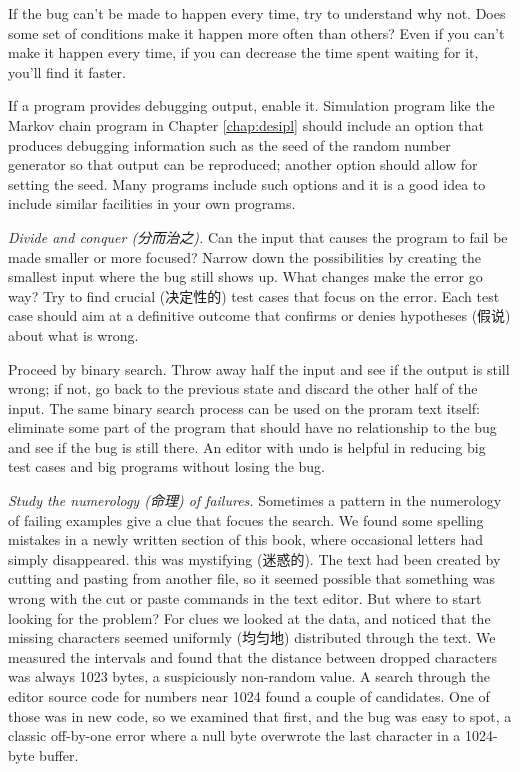 If the bug can't be made to happen every time, try to understand why not.
Does some set of conditions make it happen more often than others? Even if
you can't make it happen every time, if you can decrease the time spent
waiting for it, you'll find it faster. 

If a program provides debugging output, enable it. Simulation program like
the Markov chain program in Chapter \ref{chap:desipl} should include an
option that produces debugging information such as the seed of the random
number generator so that output can be reproduced; another option should
allow for setting the seed. Many programs include such options and it is a
good idea to include similar facilities in your own programs.

\emph{Divide and conquer (分而治之).} Can the input that causes the program
to fail be made smaller or more focused? Narrow down the possibilities by
creating the smallest input where the bug still shows up. What changes make
the error go way? Try to find crucial (决定性的) test cases that focus on
the error. Each test case should aim at a definitive outcome that confirms
or denies hypotheses (假说) about what is wrong.

Proceed by binary search. Throw away half the input and see if the output
is still wrong; if not, go back to the previous state and discard the other
half of the input. The same binary search process can be used on the proram
text itself: eliminate some part of the program that should have no
relationship to the bug and see if the bug is still there. An editor with
undo is helpful in reducing big test cases and big programs without losing
the bug.

\emph{Study the numerology (命理) of failures.} Sometimes a pattern in the
numerology of failing examples give a clue that focues the search. We found
some spelling mistakes in a newly written section of this book, where
occasional letters had simply disappeared. this was mystifying (迷惑的).
The text had been created by cutting and pasting from another file, so it
seemed possible that something was wrong with the cut or paste commands in
the text editor. But where to start looking for the problem? For clues we
looked at the data, and noticed that the missing characters seemed
uniformly (均匀地) distributed through the text. We measured the intervals
and found that the distance between dropped characters was always 1023
bytes, a suspiciously non-random value. A search through the editor source
code for numbers near 1024 found a couple of candidates. One of those was
in new code, so we examined that first, and the bug was easy to spot, a
classic off-by-one error where a null byte overwrote the last character in
a 1024-byte buffer.

